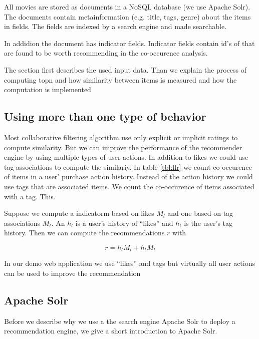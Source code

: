 All movies are stored as documents in a NoSQL database (we use Apache Solr). The documents contain metainformation (e.g. title, tags, genre) about the items in fields. The fields are indexed by a search engine and made searchable.

In addidion the document has indicator fields. Indicator fields contain id's of that are found to be worth recommending in the co-occurence analysis.

The section first describes the used input data. Than we explain the process of computing \gls{topn} and how similarity between items is measured and how the computation is implemented





\subsection{Using more than one type of behavior}
\label{sec:multimodal}

Most collaborative filtering algorithm use only explicit or implicit ratings to compute similarity.
But we can improve the performance of the recommender engine by using multiple types of user actions. In addition to likes we could use tag-associations to compute the similariy. In table \ref{tbl:llr} we count co-occurence of items in a user' purchase action history. Instead of the action history we could use tags that are associated items. We count the co-occurence of items associated with a tag. This. 

Suppose we compute a \gls{indicatorm} based on likes $M_l$ and one based on tag associations $M_t$. An $h_l$ is a user's history of ``likes'' and $h_t$ is the user's tag history. Then we can compute the recommendations $r$ with

\begin{equation}
  \label{eq:multi}
  r = h_l M_l + h_t M_t
\end{equation}

In our demo web application we use ``likes'' and tags but virtually all user actions can be used to improve the recommendation

\subsection{Apache Solr}
\label{sec:solr}

Before we describe why we use a the search engine Apache Solr to deploy a recommendation engine, we give a short introduction to Apache Solr.

